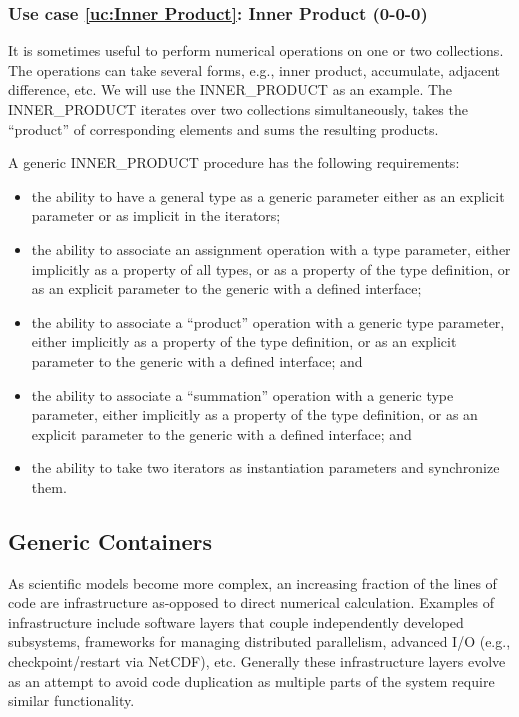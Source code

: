 \documentclass{article}
\newcounter{usecase}
\newcounter{requirement}
\newcommand{\newusecase}[2]{
\refstepcounter{usecase}\label{uc:#1}
\subsubsection{Use case \ref{uc:#1}: #1 (#2)}}
\begin{document}
\newusecase{Inner Product}{0-0-0}
It is sometimes useful to perform numerical operations on one or two
collections. The operations can take several forms, e.g., inner
product, accumulate, adjacent difference,  etc. We will use the {\rm
  INNER\_PRODUCT}  as an example.  The {\rm INNER\_PRODUCT} iterates
over two collections simultaneously, takes the ``product'' of
corresponding elements and sums the resulting products.

A generic {\rm INNER\_PRODUCT} procedure has the
following requirements:
\begin{itemize}
\item the ability to have a general type as a generic parameter
  either as an explicit parameter or as implicit in the iterators;

\item the ability to associate an assignment operation with a type
  parameter, either implicitly as a property of all types, or
  as a property of the type definition, or as an explicit parameter to
  the generic with a defined interface;

\item the ability to associate a ``product'' operation with a
  generic type parameter, either implicitly
  as a property of the type definition, or as an explicit parameter to
  the generic with a defined interface; and

\item the ability to associate a ``summation'' operation with a
  generic type parameter, either implicitly
  as a property of the type definition, or as an explicit parameter to
  the generic with a defined interface; and

\item the ability to take two iterators as instantiation
  parameters and synchronize them.

\end{itemize}



\subsection{Generic Containers}

 As scientific models become more complex, an increasing fraction of
   the lines of code are infrastructure as-opposed to direct
   numerical calculation.  Examples of infrastructure include software
   layers that couple independently developed subsystems, frameworks
   for managing distributed parallelism, advanced I/O (e.g.,
   checkpoint/restart via NetCDF), etc.  Generally these
   infrastructure layers evolve as an attempt to avoid code
   duplication as multiple parts of the system require similar
   functionality.
\end{document}
